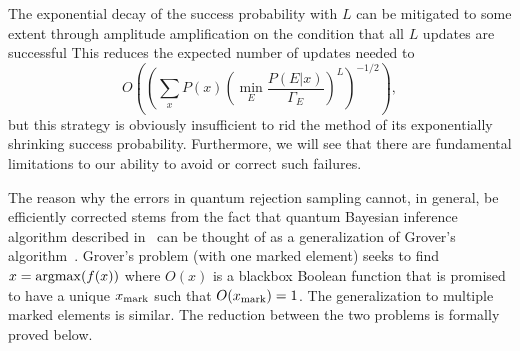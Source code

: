 \documentclass[aps,amsmath,onecolumn,amssymb]{revtex4}
\begin{document}
The exponential decay of the success probability with $L$ can be mitigated to some extent through amplitude amplification on the condition that all $L$ updates are successful  This reduces the expected number of updates needed to 
\begin{equation}
O\left(\left({\sum_x P(x) \left(\min_E \frac{P(E|x)}{\Gamma_E}\right)^L}\right)^{-1/2}\right),
\end{equation}
but this strategy is obviously insufficient to rid the method of its exponentially shrinking success probability.  Furthermore, we will see that there are fundamental limitations to our ability to avoid or correct such failures.
%


The reason why the errors in quantum rejection sampling cannot, in general, be efficiently corrected stems from the fact that quantum Bayesian inference algorithm described in~ can be thought of as a generalization of Grover's algorithm~\cite{Gro96}.  Grover's problem (with one marked element) seeks to find $x = {\rm argmax}( f(x))$ where $O(x)$ is a blackbox Boolean function that is promised to have a unique $x_{\rm mark}$ such that $O(x_{\rm mark})=1$.  The generalization to multiple marked elements is similar.  The reduction between the two problems is formally proved below.
\end{document}
